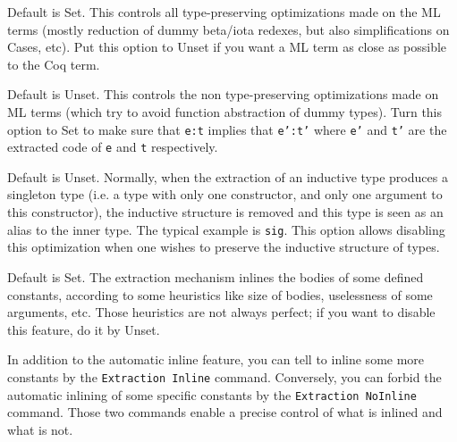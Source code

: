 \begin{description}

\item {} {}

Default is Set. This controls all type-preserving optimizations made on
the ML terms (mostly reduction of dummy beta/iota redexes, but also
simplifications on Cases, etc). Put this option to Unset if you want a
ML term as close as possible to the Coq term.

\item {}
{}

Default is Unset. This controls the non type-preserving optimizations
made on ML terms (which try to avoid function abstraction of dummy
types). Turn this option to Set to make sure that {\tt e:t}
implies that {\tt e':t'} where {\tt e'} and {\tt t'} are the extracted
code of {\tt e} and {\tt t} respectively.

\item {}
{}

Default is Unset. Normally, when the extraction of an inductive type
produces a singleton type (i.e. a type with only one constructor, and
only one argument to this constructor), the inductive structure is
removed and this type is seen as an alias to the inner type.
The typical example is {\tt sig}. This option allows disabling this
optimization when one wishes to preserve the inductive structure of types.

\item {} {}

Default is Set. The extraction mechanism
inlines the bodies of some defined constants, according to some heuristics
like size of bodies, uselessness of some arguments, etc. Those heuristics are
not always perfect; if you want to disable this feature, do it by Unset.

\item {} 
{}

In addition to the automatic inline feature, you can tell to
inline some more constants by the {\tt Extraction Inline} command. Conversely, 
you can forbid the automatic inlining of some specific constants by
the {\tt Extraction NoInline} command.
Those two commands enable a precise control of what is inlined and what is not. 


\end{description}

